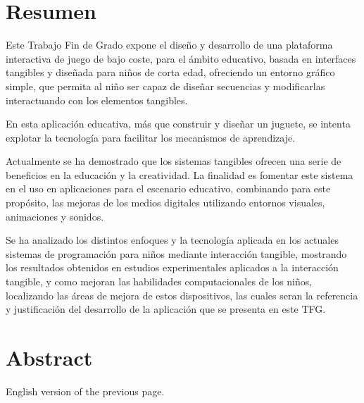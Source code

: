 \chapter{Resumen}
Este Trabajo Fin de Grado expone el diseño y desarrollo de una plataforma interactiva de juego de bajo coste, para el ámbito educativo, basada en interfaces tangibles y diseñada para niños de corta edad, ofreciendo un entorno gráfico simple, que permita al niño ser capaz de diseñar secuencias y modificarlas interactuando con los elementos tangibles.

En esta aplicación educativa, más que construir y diseñar un juguete, se intenta explotar la tecnología para facilitar los mecanismos de aprendizaje.

Actualmente se ha demostrado que los sistemas tangibles ofrecen una serie de beneficios en la educación y la creatividad. La finalidad es fomentar este sistema en el uso en aplicaciones para el escenario educativo, combinando para este propósito, las mejoras de los medios digitales utilizando entornos visuales, animaciones y sonidos.

Se ha analizado los distintos enfoques y la tecnología aplicada en los actuales sistemas de programación para niños mediante interacción tangible, mostrando los resultados obtenidos en estudios experimentales aplicados a la interacción tangible, y como mejoran las habilidades computacionales de los niños, localizando las áreas de mejora de estos dispositivos, las cuales seran la referencia y justificación del desarrollo de la aplicación que se presenta en este TFG.



\chapter{Abstract}

English version of the previous page.
